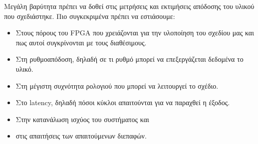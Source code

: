 Μεγάλη βαρύτητα πρέπει να δοθεί στις μετρήσεις και εκτιμήσεις απόδοσης του υλικού που σχεδιάστηκε. Πιο συγκεκριμένα πρέπει να εστιάσουμε:
\begin{itemize}
	\item Στους πόρους του FPGA που χρειάζονται για την υλοποίηση του σχεδίου μας και πως αυτοί συγκρίνονται με τους διαθέσιμους.
	\item Στη ρυθμοαπόδοση, δηλαδή σε τι ρυθμό μπορεί να επεξεργάζεται δεδομένα το υλικό.
	\item Στη μέγιστη συχνότητα ρολογιού που μπορεί να λειτουργεί το σχέδιο.
	\item Στο latency, δηλαδή πόσοι κύκλοι απαιτούνται για να παραχθεί η έξοδος.
	\item Στην κατανάλωση ισχύος του συστήματος και
	\item στις απαιτήσεις των απαιτούμενων διεπαφών. \\
\end{itemize}

